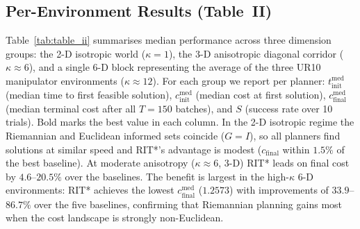 \documentclass[journal]{IEEEtran}
\begin{document}
\subsection{Per-Environment Results (Table~II)}\label{sec:results}

Table~\ref{tab:table_ii} summarises median performance across three
dimension groups: the 2-D isotropic world ($\kappa{=}1$), the
3-D anisotropic diagonal corridor ($\kappa{\approx}6$), and a
single 6-D block representing the average of the three UR10
manipulator environments ($\kappa{\approx}12$).  For each group
we report per planner: $t_{\mathrm{init}}^{\mathrm{med}}$ (median
time to first feasible solution), $c_{\mathrm{init}}^{\mathrm{med}}$
(median cost at first solution), $c_{\mathrm{final}}^{\mathrm{med}}$
(median terminal cost after all $T{=}150$ batches), and $S$ (success
rate over 10 trials).  Bold marks the best value in each column.
In the 2-D isotropic regime the Riemannian and Euclidean informed
sets coincide ($G{=}I$), so all planners find solutions at similar
speed and RIT*'s advantage is modest
($c_{\mathrm{final}}$ within $1.5\%$ of the best baseline).
At moderate anisotropy ($\kappa{\approx}6$, 3-D) RIT* leads on
final cost by $4.6$--$20.5\%$ over the baselines.
The benefit is largest in the high-$\kappa$ 6-D environments:
RIT* achieves the lowest $c_{\mathrm{final}}^{\mathrm{med}}$
($1.2573$) with improvements of $33.9$--$86.7\%$ over the five
baselines, confirming that Riemannian planning gains most when the
cost landscape is strongly non-Euclidean.

\end{document}
